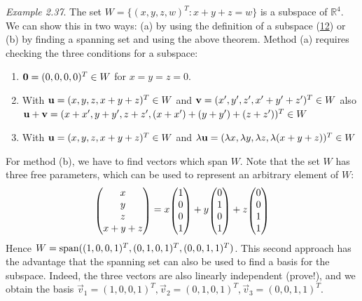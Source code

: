 \documentclass[
  letterpaper,
  DIV=11,
  numbers=noendperiod]{scrartcl}
\theoremstyle{remark}
\begin{document}
\emph{Example 2.37}. The set \(W=\{(x,y,z,w)^{T}:x+y+z=w\}\) is a
subspace of \(\mathbb{R}^{4}\). We can show this in two ways: (a) by
using the definition of a subspace (\hyperref[subspace]{12}) or (b) by
finding a spanning set and using the above theorem. Method (a) requires
checking the three conditions for a subspace:

\begin{enumerate}
\def\labelenumi{\arabic{enumi}.}
\item
  \({\bf 0} = (0,0,0,0)^{T} \in W\) for \(x=y=z=0\).
\item
  With \({\bf u} =  (x,y,z,x+y+z)^{T} \in W\) and
  \({\bf v} = (x',y',z',x'+y'+z')^{T} \in W\) also
  \({\bf u} + {\bf v}=  (x+x',y+y',z+z',(x+x')+(y+y')+(z+z'))^{T} \in W\)
\item
  With \({\bf u} =  (x,y,z,x+y+z)^{T} \in W\) and
  \(\lambda {\bf u} =  (\lambda x,\lambda y,\lambda z, \lambda (x+y+z))^{T} \in W\)
\end{enumerate}

For method (b), we have to find vectors which span \(W\). Note that the
set \(W\) has three free parameters, which can be used to represent an
arbitrary element of \(W\):
\[\scriptscriptstyle \begin{pmatrix}   x\\y\\z\\x+y+z  \end{pmatrix} \textstyle = x \scriptscriptstyle \begin{pmatrix}   1\\0\\0\\1  \end{pmatrix} \textstyle +y \scriptscriptstyle \begin{pmatrix}   0\\1\\0\\1  \end{pmatrix} \textstyle + z \scriptscriptstyle \begin{pmatrix}   0\\0\\1\\1  \end{pmatrix} \textstyle\]
Hence \(W = {\rm span}((1,0,0,1)^{T}, (0,1,0,1)^{T}, (0,0,1,1)^{T})\).
This second approach has the advantage that the spanning set can also be
used to find a basis for the subspace. Indeed, the three vectors are
also linearly independent (prove!), and we obtain the basis
\({\vec v}_{1}=(1,0,0,1)^{T},{\vec v}_{2}=(0,1,0,1)^{T},{\vec v}
_{3}=(0,0,1,1)^{T}\).
\end{document}
